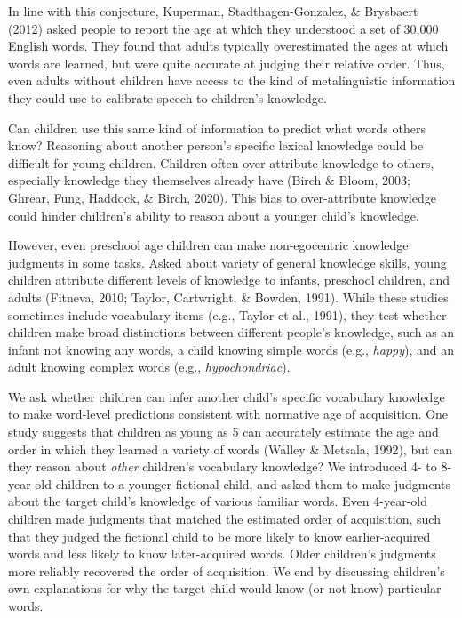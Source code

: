 \documentclass[10pt, letterpaper]{article}
\begin{document}
In line with this conjecture, Kuperman, Stadthagen-Gonzalez, \&
Brysbaert (2012) asked people to report the age at which they understood
a set of 30,000 English words. They found that adults typically
overestimated the ages at which words are learned, but were quite
accurate at judging their relative order. Thus, even adults without
children have access to the kind of metalinguistic information they
could use to calibrate speech to children's knowledge.

Can children use this same kind of information to predict what words
others know? Reasoning about another person's specific lexical knowledge
could be difficult for young children. Children often over-attribute
knowledge to others, especially knowledge they themselves already have
(Birch \& Bloom, 2003; Ghrear, Fung, Haddock, \& Birch, 2020). This bias
to over-attribute knowledge could hinder children's ability to reason
about a younger child's knowledge.

However, even preschool age children can make non-egocentric knowledge
judgments in some tasks. Asked about variety of general knowledge
skills, young children attribute different levels of knowledge to
infants, preschool children, and adults (Fitneva, 2010; Taylor,
Cartwright, \& Bowden, 1991). While these studies sometimes include
vocabulary items (e.g., Taylor et al., 1991), they test whether children
make broad distinctions between different people's knowledge, such as an
infant not knowing any words, a child knowing simple words (e.g.,
\emph{happy}), and an adult knowing complex words (e.g.,
\emph{hypochondriac}).

We ask whether children can infer another child's specific vocabulary
knowledge to make word-level predictions consistent with normative age
of acquisition. One study suggests that children as young as 5 can
accurately estimate the age and order in which they learned a variety of
words (Walley \& Metsala, 1992), but can they reason about \emph{other}
children's vocabulary knowledge? We introduced 4- to 8-year-old children
to a younger fictional child, and asked them to make judgments about the
target child's knowledge of various familiar words. Even 4-year-old
children made judgments that matched the estimated order of acquisition,
such that they judged the fictional child to be more likely to know
earlier-acquired words and less likely to know later-acquired words.
Older children's judgments more reliably recovered the order of
acquisition. We end by discussing children's own explanations for why
the target child would know (or not know) particular words.
\end{document}
